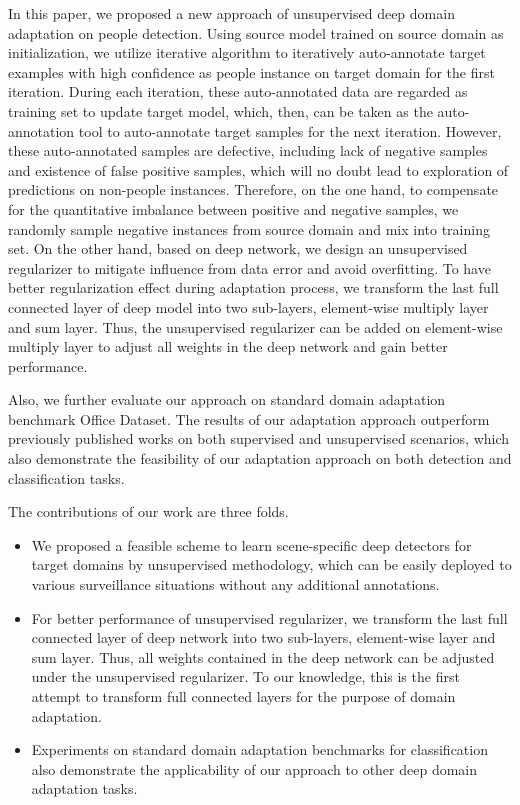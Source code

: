 \documentclass[runningheads]{llncs}
\begin{document}
In this paper, we proposed a new approach of unsupervised deep domain adaptation on people detection. Using source model trained on source domain as initialization, we utilize iterative algorithm to iteratively auto-annotate target examples with high confidence as people instance on target domain for the first iteration. During each iteration, these auto-annotated data are regarded as training set to update target model, which, then, can be taken as the auto-annotation tool to auto-annotate target samples for the next iteration. However, these auto-annotated samples are defective, including lack of negative samples and existence of false positive samples, which will no doubt lead to exploration of predictions on non-people instances. Therefore, on the one hand, to compensate for the quantitative imbalance between positive and negative samples, we randomly sample negative instances from source domain and mix into training set. On the other hand, based on deep network, we design an unsupervised regularizer to mitigate influence from data error and avoid overfitting. To have better regularization effect during adaptation process, we transform the last full connected layer of deep model into two sub-layers, element-wise multiply layer and sum layer. Thus, the unsupervised regularizer can be added on element-wise multiply layer to adjust all weights in the deep network and gain better performance.

Also, we further evaluate our approach on standard domain adaptation benchmark Office Dataset. The results of our adaptation approach outperform previously published works on both supervised and unsupervised scenarios, which also demonstrate the feasibility of our adaptation approach on both detection and classification tasks.

The contributions of our work are three folds.
\begin{itemize}
\item We proposed a feasible scheme to learn scene-specific deep detectors for target domains by unsupervised methodology, which can be easily deployed to various surveillance situations without any additional annotations.
\item For better performance of unsupervised regularizer, we transform the last full connected layer of deep network into two sub-layers, element-wise layer and sum layer. Thus, all weights contained in the deep network can be adjusted under the unsupervised regularizer. To our knowledge, this is the first attempt to transform full connected layers for the purpose of domain adaptation.
\item Experiments on standard domain adaptation benchmarks for classification also demonstrate the applicability of our approach to other deep domain adaptation tasks.
\end{itemize}
\end{document}
